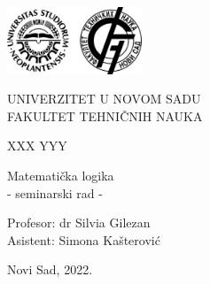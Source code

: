 \documentclass[12pt, a4paper, titlepage, twoside]{article}
\author{XXX YYY}
\theoremstyle{definition}
\begin{document}
\begin{titlepage}


\begin{center}
\includegraphics[height=2cm]{uns_ftn_logo}
\end{center}

\begin{center}
\large UNIVERZITET U NOVOM SADU \\
\large FAKULTET TEHNI\v CNIH NAUKA\\[3.5cm]
\end{center} 


\begin{flushleft}
\large XXX YYY\\[3.5cm]
\end{flushleft}

\begin{center}
\huge  Matemati\v cka logika\\
\large - seminarski rad - \\[3.5cm]
\end{center}

\begin{flushleft}
\large Profesor: dr Silvia Gilezan \\
\large Asistent: Simona Ka\v sterovi\'c \\[4.5cm]
\end{flushleft}

\begin{center}
\large Novi Sad, 2022.
\end{center}

\end{titlepage}

\tableofcontents

\newpage
\end{document}
